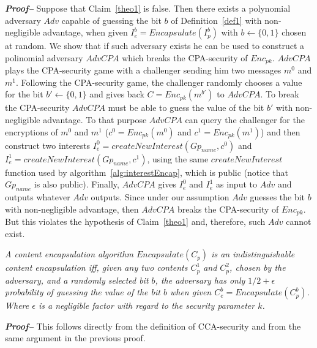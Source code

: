 \textit{\textbf{Proof--}} Suppose that Claim~\ref{theo1} is false. Then there exists a polynomial adversary $Adv$ capable of guessing the bit $b$ of Definition~\ref{def1} with non-negligible advantage, when given $I_e^b = Encapsulate(I_p^b)$ with $b \leftarrow \{0,1\}$ chosen at random. We show that if such adversary exists he can be used to construct a polinomial adversary $AdvCPA$ which breaks the CPA-security of $Enc_{pk}$. $AdvCPA$ plays the CPA-security game with a challenger sending him two messages $m^0$ and $m^1$. Following the CPA-security game, the challenger randomly chooses a value for the bit $b' \leftarrow \{0,1\}$ and gives back $C = Enc_{pk}(m^{b'})$ to $AdvCPA$. To break the CPA-security $AdvCPA$ must be able to guess the value of the bit $b'$ with non-negligible advantage. To that purpose $AdvCPA$ can query the challenger for the encryptions of $m^0$ and $m^1$ ($c^0 = Enc_{pk}(m^0)$ and $c^1 = Enc_{pk}(m^1)$) and then construct two interests $I_e^0 = createNewInterest(Gp_{name}, c^0)$ and $I_e^1 = createNewInterest(Gp_{name}, c^1)$, using the same $createNewInterest$ function used by algorithm~\ref{alg:interestEncap}, which is public (notice that $Gp_{name}$ is also public). Finally, $AdvCPA$ gives $I_e^0$ and $I_e^1$ as input to $Adv$ and outputs whatever $Adv$ outputs. Since under our assumption $Adv$ guesses the bit $b$ with non-negligible advantage, then $AdvCPA$ breaks the CPA-security of $Enc_{pk}$. But this violates the hypothesis of Claim~\ref{theo1} and, therefore, such $Adv$ cannot exist.

\begin{definition}
\textit{
A content encapsulation algorithm $Encapsulate(C_p)$ is an indistinguishable content encapsulation iff, given any two contents $C_p^1$ and $C_p^2$, chosen by the adversary, and a randomly selected bit $b$, the adversary has only $1/2 + \epsilon$ probability of guessing the value of the bit $b$ when given $C_e^b = Encapsulate(C_p^b)$. Where $\epsilon$ is a negligible factor with regard to the security parameter $k$.
}
\end{definition}


\textit{\textbf{Proof--}} This follows directly from the definition of CCA-security and from the
same argument in the previous proof.
